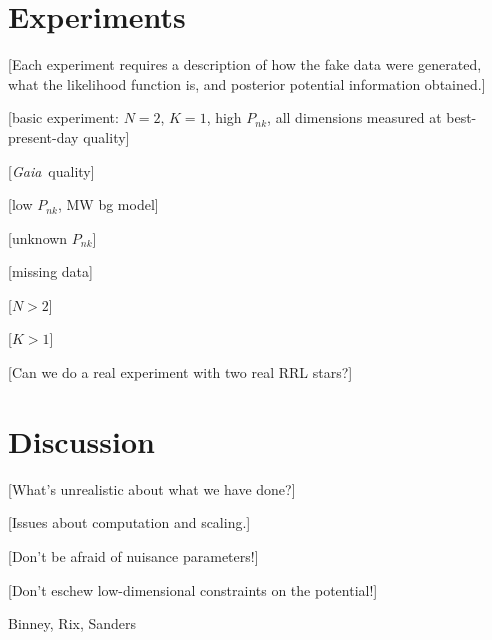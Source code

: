 \documentclass[letterpaper,12pt,preprint]{aastex}
\newcommand{\project}[1]{\textsl{#1}}
\newcommand{\gaia}{\project{Gaia}}
\begin{document}
\section{Experiments}

[Each experiment requires a description of how the fake data were
  generated, what the likelihood function is, and posterior potential
  information obtained.]

[basic experiment: $N=2$, $K=1$, high $P_{nk}$, all dimensions
  measured at best-present-day quality]

[\gaia\ quality]

[low $P_{nk}$, MW bg model]

[unknown $P_{nk}$]

[missing data]

[$N>2$]

[$K>1$]

[Can we do a real experiment with two real RRL stars?]

\section{Discussion}

[What's unrealistic about what we have done?]

[Issues about computation and scaling.]

[Don't be afraid of nuisance parameters!]

[Don't eschew low-dimensional constraints on the potential!]

\acknowledgements
Binney, Rix, Sanders
\end{document}
